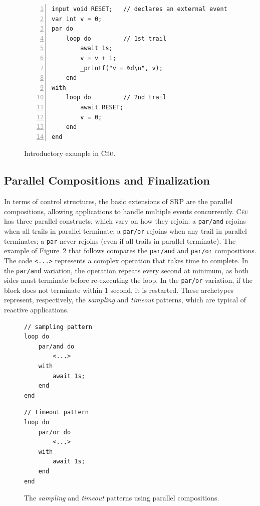 \documentclass{acm_proc_article-sp}
\newcommand{\CEU}{\textsc{C\'{e}u}\xspace}
\newcommand{\code}[1] {{\small{\texttt{#1}}}}
\newcommand{\1}{\;}
\newcommand{\2}{\;\;}
\newcommand{\3}{\;\;\;}
\newcommand{\5}{\;\;\;\;\;}
\begin{document}
\begin{figure}[t]
\begin{lstlisting}[numbers=left,xleftmargin=3em]
input void RESET;   // declares an external event
var int v = 0;
par do
    loop do         // 1st trail
        await 1s;
        v = v + 1;
        _printf("v = %d\n", v);
    end
with
    loop do         // 2nd trail
        await RESET;
        v = 0;
    end
end
\end{lstlisting}
\caption{ Introductory example in \CEU.
\label{lst.intro}
}
\end{figure}

\subsection{Parallel Compositions and Finalization}

In terms of control structures, the basic extensions of SRP are the parallel 
compositions, allowing applications to handle multiple events concurrently.
%
\CEU has three parallel constructs, which vary on how they rejoin:
a \code{par/and} rejoins when all trails in parallel terminate;
a \code{par/or} rejoins when any trail in parallel terminates;
a \code{par} never rejoins (even if all trails in parallel terminate).
%
The example of Figure~\ref{lst.patts} that follows compares the \code{par/and} 
and \code{par/or} compositions.
%
The code \code{<...>} represents a complex operation that takes time to 
complete.
%
In the \code{par/and} variation, the operation repeats every second at minimum, 
as both sides must terminate before re-executing the loop.
In the \code{par/or} variation, if the block does not terminate within 1 
second, it is restarted.
%
These archetypes represent, respectively, the \emph{sampling} and 
\emph{timeout} patterns, which are typical of reactive applications.

\begin{figure}[t]
\begin{minipage}[t]{0.40\linewidth}
\begin{lstlisting}
// sampling pattern
loop do
    par/and do
        <...>
    with
        await 1s;
    end
end
\end{lstlisting}
\end{minipage}
%
\begin{minipage}[t]{0.40\linewidth}
\begin{lstlisting}
// timeout pattern
loop do
    par/or do
        <...>
    with
        await 1s;
    end
end
\end{lstlisting}
\end{minipage}
\caption{ The \emph{sampling} and \emph{timeout} patterns using parallel 
compositions.
\label{lst.patts}
}
\end{figure}
\end{document}
